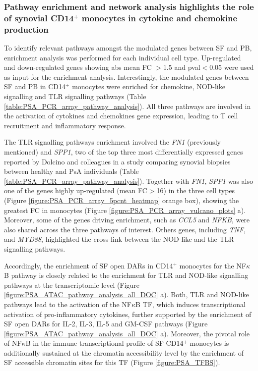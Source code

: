 \subsubsection{Pathway enrichment and network analysis highlights the role of synovial CD14$^+$ monocytes in cytokine and chemokine production}
To identify relevant pathways amongst the modulated genes between SF and PB, enrichment analysis was performed for each individual cell type. Up-regulated and down-regulated genes showing abs mean FC $>$1.5 and pval$<$0.05 were used as input for the enrichment analysis. Interestingly, the modulated genes between SF and PB in CD14$^+$ monocytes were enriched for chemokine, NOD-like signalling and TLR signalling pathways (Table \ref{table:PSA_PCR_array_pathway_analysis}). All three pathways are involved in the activation of cytokines and chemokines gene expression, leading to T cell recruitment and inflammatory response. 

The TLR signalling pathways enrichment involved the \textit{FN1} (previously mentioned) and \textit{SPP1}, two of the top three most differentially expressed genes reported by Dolcino and colleagues in a study comparing synovial biopsies between healthy and PsA individuals \parencite{Dolcino2015} (Table \ref{table:PSA_PCR_array_pathway_analysis}). Together with \textit{FN1}, \textit{SPP1} was also one of the genes highly up-regulated (mean FC$>$16) in the three cell types (Figure \ref{figure:PSA_PCR_array_5pcnt_heatmap} orange box), showing the greatest FC in monocytes (Figure \ref{figure:PSA_PCR_array_vulcano_plots} a). Moreover, some of the genes driving enrichment, such as \textit{CCL5} and \textit{NFKB}, were also shared across the three pathways of interest. Others genes, including \textit{TNF},  and \textit{MYD88}, highlighted the cross-link between the NOD-like and the TLR signalling pathways. 

Accordingly, the enrichment of SF open DARs in CD14$^+$ monocytes for the NF$\kappa$B pathway is closely related to the enrichment for TLR and NOD-like signalling pathways at the transcriptomic level (Figure \ref{figure:PSA_ATAC_pathway_analysis_all_DOC} a). Both, TLR and NOD-like pathways lead to the activation of the NF$\kappa$B TF, which induces transcriptional activation of pro-inflammatory cytokines, further supported by the enrichment of SF open DARs for IL-2, IL-3, IL-5 and GM-CSF pathways (Figure \ref{figure:PSA_ATAC_pathway_analysis_all_DOC} a). Moreover, the pivotal role of NF$\kappa$B in the immune transcriptional profile of SF CD14$^+$ monocytes  is additionally sustained at the chromatin accessibility level by the enrichment of SF accessible chromatin sites for this TF (Figure \ref{figure:PSA_TFBS}).  


